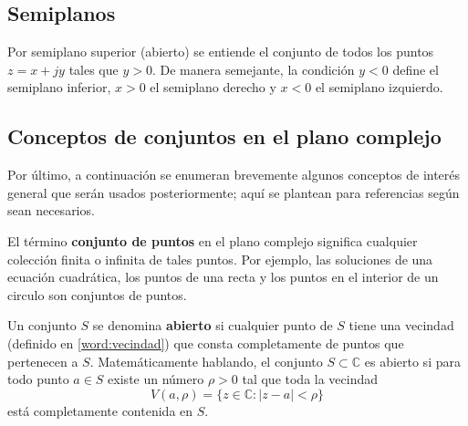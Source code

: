 \subsection{Semiplanos}

Por semiplano superior (abierto) se entiende el conjunto de todos los puntos $z=x+jy$ tales que $y>0$. De manera semejante, la condición $y<0$ define el semiplano inferior, $x>0$ el semiplano derecho y $x<0$ el semiplano izquierdo.

\subsection{Conceptos de conjuntos en el plano complejo}

Por último, a continuación se enumeran brevemente algunos conceptos de interés general que serán usados posteriormente; aquí se plantean para referencias según sean necesarios.

El término \textbf{conjunto de puntos} en el plano complejo significa cualquier colección finita o infinita de tales puntos. Por ejemplo, las soluciones de una ecuación cuadrática, los puntos de una recta y los puntos en el interior de un circulo son conjuntos de puntos.

Un conjunto $S$ se denomina \textbf{abierto} si cualquier punto de $S$ tiene una vecindad (definido en \ref{word:vecindad}) que consta completamente de puntos que pertenecen a $S$. Matemáticamente hablando, el conjunto $S \subset \mathbb{C}$ es abierto si para todo punto $a \in S$ existe un número $\rho > 0$ tal que toda la vecindad
\[
V(a,\rho) = \{z \in \mathbb{C} : |z - a| < \rho\}
\]
está completamente contenida en \( S \).

